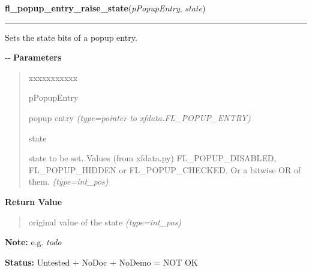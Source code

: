     \vspace{0.5ex}

\hspace{.8\funcindent}\begin{boxedminipage}{\funcwidth}

    \raggedright \textbf{fl\_popup\_entry\_raise\_state}(\textit{pPopupEntry}, \textit{state})

    \vspace{-1.5ex}

    \rule{\textwidth}{0.5\fboxrule}
\setlength{\parskip}{2ex}

Sets the state bits of a popup entry.

-{}-
\setlength{\parskip}{1ex}
      \textbf{Parameters}
      \vspace{-1ex}

      \begin{quote}
        \begin{Ventry}{xxxxxxxxxxx}

          \item[pPopupEntry]


popup entry
            {\it (type=pointer to xfdata.FL\_POPUP\_ENTRY)}

          \item[state]


state to be set. Values (from xfdata.py) FL\_POPUP\_DISABLED,
FL\_POPUP\_HIDDEN or FL\_POPUP\_CHECKED. Or a bitwise OR of them.
            {\it (type=int\_pos)}

        \end{Ventry}

      \end{quote}

      \textbf{Return Value}
    \vspace{-1ex}

      \begin{quote}

original value of the state
      {\it (type=int\_pos)}

      \end{quote}

\textbf{Note:} 
e.g. \emph{todo}


\textbf{Status:} 
Untested + NoDoc + NoDemo = NOT OK


    \end{boxedminipage}

    \label{xformslib:flpopup:fl_popup_entry_toggle_state}

